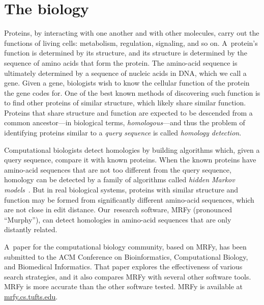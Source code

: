 \documentclass[]{jfp1}
\let\cite\citep
\begin{document}
\section{The biology}

Proteins, by
interacting with one another and with other 
molecules, carry out the functions of living cells: metabolism, regulation, 
signaling, and so on.
A~protein's function is determined by its structure, 
and its structure is determined by the sequence of amino acids that
form the protein.
The amino-acid sequence is ultimately determined by a sequence of
nucleic acids in DNA, which we call a gene.
Given a gene, biologists wish to know the cellular
function of the protein the gene codes for.
One of the best known methods of discovering such function is
to find other proteins of 
similar structure, which likely share similar function.
Proteins that share structure and function are expected to be
descended from a common ancestor---in biological terms, \emph{homologous}---and
thus
the problem of identifying proteins similar to a \textit{query sequence} is called 
\textit{homology detection}.




Computational biologists detect homologies by building 
algorithms which, given a {query sequence}, %
compare it with known proteins.
When the known proteins have amino-acid sequences that
are not too different from the query sequence, homology can be
detected by
a family of algorithms called 
\textit{hidden Markov models}~\cite{Eddy:1998ut}.
But in real biological systems,
proteins with similar structure and function may be formed from significantly 
different amino-acid sequences, which are not close in edit distance.
Our~research software, MRFy (pronounced
``Murphy''), can detect homologies 
in amino-acid sequences that are only distantly related.

A~paper for the computational biology community, based on MRFy, has been
submitted to the ACM Conference on Bioinformatics, Computational Biology, and 
Biomedical Informatics.
That paper explores the effectiveness of various search strategies,
and it also
compares MRFy with several other software tools.
MRFy is more accurate than the other software tested.
MRFy is available at \url{mrfy.cs.tufts.edu}.
%
%
\end{document}

